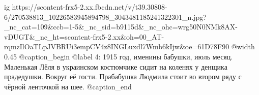  
 
 
 
 

\ifcmt
  ig https://scontent-frx5-2.xx.fbcdn.net/v/t39.30808-6/270538813_10226583945894798_3043481185241322301_n.jpg?_nc_cat=109&ccb=1-5&_nc_sid=b9115d&_nc_ohc=wrg50N0NMk8AX-vDUGT&_nc_ht=scontent-frx5-2.xx&oh=00_AT-rqmzIlOaTLpJVBRUi3empCV4z8INGLuxdl7Wmb6kIjw&oe=61D78F90
  @width 0.45
	@caption_begin
		@label 4:
		1915 год, именины бабушки, июль месяц. Маленькая Лёля в украинском
		костюмчике сидит на коленях у денщика прадедушки. Вокруг её гости.
		Прабабушка Людмила стоит во втором ряду с чёрной ленточкой на шее.
	@caption_end
\fi
